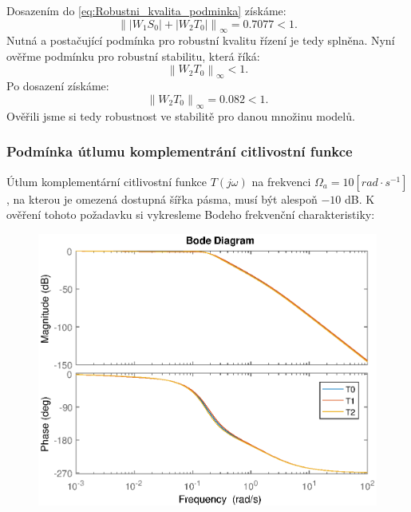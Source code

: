 \documentclass[a4paper,11pt]{article}
\begin{document}
Dosazením do \ref{eq:Robustni_kvalita_podminka} získáme:
\begin{equation} 
\left \| \left | W_{1}S_{0} \right |+ \left | W_{2}T_{0} \right |\right \|_{\infty }= 0.7077 <1.
\end{equation}
Nutná a postačující podmínka pro robustní kvalitu řízení je tedy splněna. Nyní ověřme podmínku pro robustní stabilitu, která říká:
\begin{equation} 
\left \| W_{2}T_{0}\right \|_{\infty }<1.
\end{equation}
Po dosazení získáme:
\begin{equation} 
\left \| W_{2}T_{0}\right \|_{\infty }=0.082<1.
\end{equation}
Ověřili jsme si tedy robustnost ve stabilitě pro danou množinu modelů.

\newpage 
\subsubsection{Podmínka útlumu komplementrání citlivostní funkce}
Útlum komplementární citlivostní funkce $ T\left ( j\omega \right ) $ na frekvenci $ \Omega _{a}=10 \left[ rad\cdot s^{-1}   \right ] $, na kterou je omezená dostupná šířka pásma, musí být alespoň $ -10 $ dB. K ověření tohoto požadavku si vykresleme Bodeho frekvenční charakteristiky:
\begin{figure}[htbp]
	\begin{center}
	\includegraphics[scale = 1.0]{obrazky/citlivostniFunkce.eps}
	\label{fig:citlivostka}
	\end{center}
\end{figure}
\end{document}

